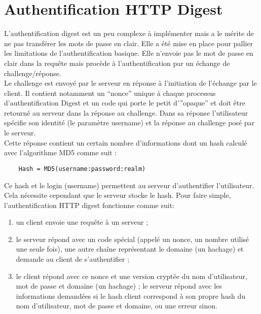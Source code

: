 \section{Authentification HTTP Digest}
L’authentification digest est un peu  complexe à implémenter mais a le mérite de ne pas transférer les mots de passe en clair. Elle a été mise en place pour pallier les limitations de l’authentification basique. Elle n’envoie pas le mot de passe en clair dans la requête mais procède à l’authentification par un échange de challenge/réponse.\\
Le challenge est envoyé par le serveur en réponse à l’initiation de l’échange par le client. Il contient notamment un “nonce” unique à chaque processus d’authentification Digest et un code qui porte le petit d’”opaque” et doit être retourné au serveur dans la réponse au challenge. Dans sa réponse l’utilisateur spécifie son identité (le paramètre username) et la réponse au challenge posé par le serveur. \\
Cette réponse contient un certain nombre d’informations dont un hash calculé avec l'algorithme MD5 comme suit :
\begin{verbatim}
	Hash = MD5(username:password:realm)
\end{verbatim}
Ce hash et le login (username) permettent au serveur d’authentifier l’utilisateur. Cela nécessite cependant que le serveur stocke le hash.
Pour faire simple, l'authentification HTTP digest fonctionne comme suit:
\begin{enumerate}
	\item un client envoie une requête à un serveur ; 
	\item le serveur répond avec un code spécial (appelé un nonce, un nombre utilisé une seule fois), une autre chaîne représentant le domaine (un hachage) et demande au client de s'authentifier ;
	\item le client répond avec ce nonce et une version cryptée du nom d'utilisateur, mot de passe et domaine (un hachage) ;
	\itemcheck le serveur répond avec les informations demandées si le hash client correspond à son propre hash du nom d'utilisateur, mot de passe et domaine, ou une erreur sinon.
\end{enumerate}

%

